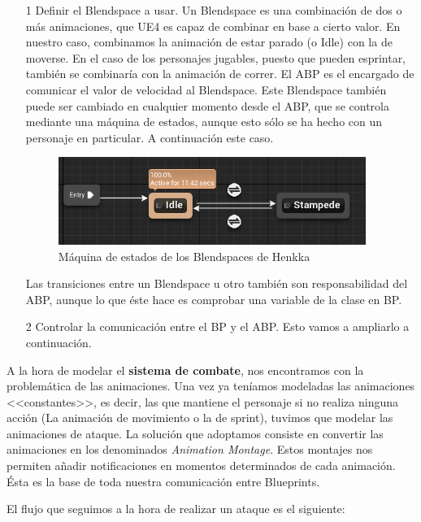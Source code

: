 \begin{itemize}
\item[1] Definir el Blendspace a usar. Un Blendspace es una combinación de dos o más animaciones, que \ac{UE4} es capaz de combinar en base a cierto valor. En nuestro caso, combinamos la animación de estar parado (o Idle) con la de moverse. En el caso de los personajes jugables, puesto que pueden esprintar, también se combinaría con la animación de correr. El \ac{ABP} es el encargado de comunicar el valor de velocidad al Blendspace. Este Blendspace también puede ser cambiado en cualquier momento desde el \ac{ABP}, que se controla mediante una máquina de estados, aunque esto sólo se ha hecho con un personaje en particular. A continuación este caso.


\begin{figure}[H]
  \centering
  \includegraphics[width=10cm]{./images/Henkka_SM.png}
  \caption{Máquina de estados de los Blendspaces de Henkka}
  \label{HenkkaSM}
\end{figure}


Las transiciones entre un Blendspace u otro también son responsabilidad del \ac{ABP}, aunque lo que éste hace es comprobar una variable de la clase en \ac{BP}.

\item[2] Controlar la comunicación entre el \ac{BP} y el \ac{ABP}. Esto vamos a ampliarlo a continuación.
\end{itemize}


A la hora de modelar el \textbf{sistema de combate}, nos encontramos con la problemática de las animaciones. Una vez ya teníamos modeladas las animaciones <<constantes>>, es decir, las que mantiene el personaje si no realiza ninguna acción (La animación de movimiento o la de sprint), tuvimos que modelar las animaciones de ataque. La solución que adoptamos consiste en convertir las animaciones en los denominados \textit{Animation Montage}. Estos montajes nos permiten añadir notificaciones en momentos determinados de cada animación. Ésta es la base de toda nuestra comunicación entre Blueprints.


El flujo que seguimos a la hora de realizar un ataque es el siguiente:

